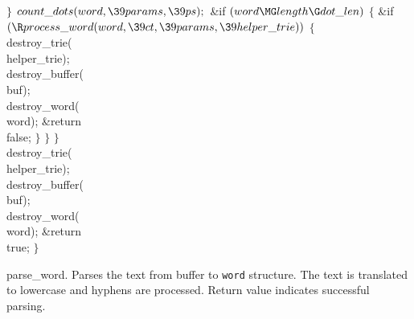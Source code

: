 \4${}\}{}$\2\6
${}\\{count\_dots}(\\{word},\39\\{params},\39\\{ps});{}$\6
\&{if} ${}(\\{word}\MG\\{length}\G\\{dot\_len}){}$\5
${}\{{}$\1\6
\&{if} ${}(\R\\{process\_word}(\\{word},\39\\{ct},\39\\{params},\39\\{helper%
\_trie})){}$\5
${}\{{}$\1\6
\\{destroy\_trie}(\\{helper\_trie});\6
\\{destroy\_buffer}(\\{buf});\6
\\{destroy\_word}(\\{word});\6
\&{return} \\{false};\6
\4${}\}{}$\2\6
\4${}\}{}$\2\6
\4${}\}{}$\2\6
\\{destroy\_trie}(\\{helper\_trie});\6
\\{destroy\_buffer}(\\{buf});\6
\\{destroy\_word}(\\{word});\6
\&{return} \\{true};\6
\4${}\}{}$\2\par
\fi

parse\_word.
Parses the text from buffer to {\tt word} structure. The text is translated to
lowercase and hyphens are processed.
Return value indicates successful parsing.

